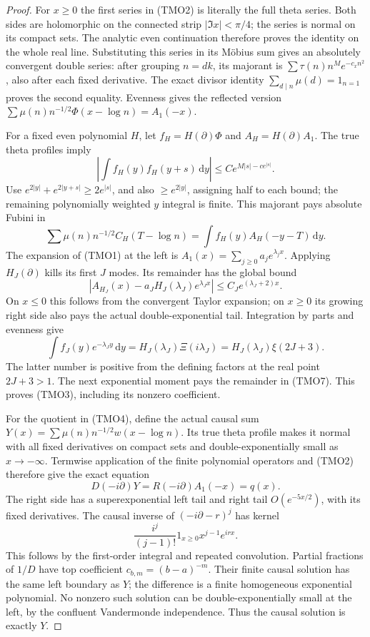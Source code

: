 \documentclass[11pt]{article}
\theoremstyle{remark}\newtheorem{remark}[theorem]{Remark}
\newcommand{\dd}{\,\mathrm d}
\begin{document}
\begin{proof}
For \(x\ge0\) the first series in (TMO2) is literally the full
theta series. Both sides are holomorphic on the connected strip
\(|\Im x|<\pi/4\); the series is normal on its compact sets.
The analytic even continuation therefore proves the identity
on the whole real line. Substituting this series in its
M\"obius sum gives an absolutely convergent double series:
after grouping \(n=dk\), its majorant is
\(\sum\tau(n)n^Me^{-c_xn^2}\), also after each fixed derivative.
The exact divisor identity \(\sum_{d\mid n}\mu(d)=1_{n=1}\)
proves the second equality. Evenness gives the reflected version
\(\sum\mu(n)n^{-1/2}\Phi(x-\log n)=A_1(-x)\).

For a fixed even polynomial \(H\), let \(f_H=H(\partial)\Phi\)
and \(A_H=H(\partial)A_1\).
The true theta profiles imply
\[
 \left|\int f_H(y)f_H(y+s)\dd y\right|
              \le Ce^{M|s|-ce^{|s|}} .
                                                               \tag{TMO6}
\]
Use \(e^{2|y|}+e^{2|y+s|}\ge2e^{|s|}\), and also
\(\ge e^{2|y|}\), assigning half to each bound;
the remaining polynomially weighted \(y\) integral is finite.
This majorant pays absolute Fubini in
\[
 \sum\mu(n)n^{-1/2}C_H(T-\log n)
                        =\int f_H(y)A_H(-y-T)\dd y.            \tag{TMO7}
\]
The expansion of (TMO1) at the left is
\(A_1(x)=\sum_{j\ge0}a_je^{\lambda_jx}\).
Applying \(H_J(\partial)\) kills its first \(J\) modes.
Its remainder has the global bound
\[
 |A_{H_J}(x)-a_JH_J(\lambda_J)e^{\lambda_Jx}|
                                    \le C_Je^{(\lambda_J+2)x}.
\]
On \(x\le0\) this follows from the convergent Taylor expansion;
on \(x\ge0\) its growing right side also pays the actual
double-exponential tail. Integration by parts and evenness give
\[
 \int f_J(y)e^{-\lambda_Jy}\dd y
        =H_J(\lambda_J)\Xi(i\lambda_J)
        =H_J(\lambda_J)\xi(2J+3).
\]
The latter number is positive from the defining factors at
the real point \(2J+3>1\).
The next exponential moment pays the remainder in (TMO7).
This proves (TMO3), including its nonzero coefficient.

For the quotient in (TMO4), define the actual causal sum
\(Y(x)=\sum\mu(n)n^{-1/2}w(x-\log n)\).
Its true theta profile makes it normal with all fixed derivatives
on compact sets and double-exponentially small as \(x\to-\infty\).
Termwise application of the finite polynomial operators and
(TMO2) therefore give the exact equation
\[
 D(-i\partial)Y=R(-i\partial)A_1(-x)=q(x).                    \tag{TMO8}
\]
The right side has a superexponential left tail and right
tail \(O(e^{-5x/2})\), with its fixed derivatives.
The causal inverse of \((-i\partial-r)^j\) has kernel
\[
 \frac{i^j}{(j-1)!}1_{x\ge0}x^{j-1}e^{irx}.
\]
This follows by the first-order integral and repeated convolution.
Partial fractions of \(1/D\) have top coefficient
\(c_{b,m}=(b-a)^{-m}\).
Their finite causal solution has the same left boundary as \(Y\);
the difference is a finite homogeneous exponential polynomial.
No nonzero such solution can be double-exponentially small at
the left, by the confluent Vandermonde independence.
Thus the causal solution is exactly \(Y\).


\end{proof}
\end{document}
